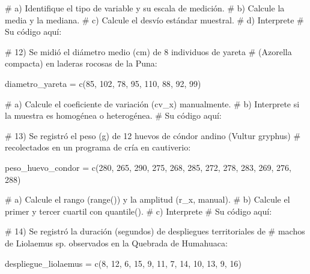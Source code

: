 \documentclass[
  spanish,
  letterpaper,
  DIV=11,
  numbers=noendperiod]{scrreprt}
\newenvironment{Shaded}{\begin{snugshade}}{\end{snugshade}}
\newcommand{\CommentTok}[1]{\textcolor[rgb]{0.37,0.37,0.37}{#1}}
\newcommand{\DecValTok}[1]{\textcolor[rgb]{0.68,0.00,0.00}{#1}}
\newcommand{\FunctionTok}[1]{\textcolor[rgb]{0.28,0.35,0.67}{#1}}
\newcommand{\NormalTok}[1]{\textcolor[rgb]{0.00,0.23,0.31}{#1}}
\newcommand{\OtherTok}[1]{\textcolor[rgb]{0.00,0.23,0.31}{#1}}
\begin{document}
\begin{Shaded}
\begin{Highlighting}[]
\CommentTok{\#     a) Identifique el tipo de variable y su escala de medición.}
\CommentTok{\#     b) Calcule la media y la mediana.}
\CommentTok{\#     c) Calcule el desvío estándar muestral.}
\CommentTok{\#     d) Interprete}
\CommentTok{\# Su código aquí:}


\CommentTok{\# 12) Se midió el diámetro medio (cm) de 8 individuos de yareta}
\CommentTok{\#     (Azorella compacta) en laderas rocosas de la Puna:}

\NormalTok{diametro\_yareta }\OtherTok{=} \FunctionTok{c}\NormalTok{(}\DecValTok{85}\NormalTok{, }\DecValTok{102}\NormalTok{, }\DecValTok{78}\NormalTok{, }\DecValTok{95}\NormalTok{, }\DecValTok{110}\NormalTok{, }\DecValTok{88}\NormalTok{, }\DecValTok{92}\NormalTok{, }\DecValTok{99}\NormalTok{)}

\CommentTok{\#     a) Calcule el coeficiente de variación (cv\_x) manualmente.}
\CommentTok{\#     b) Interprete si la muestra es homogénea o heterogénea.}
\CommentTok{\# Su código aquí:}


\CommentTok{\# 13) Se registró el peso (g) de 12 huevos de cóndor andino (Vultur gryphus)}
\CommentTok{\#     recolectados en un programa de cría en cautiverio:}

\NormalTok{peso\_huevo\_condor }\OtherTok{=} \FunctionTok{c}\NormalTok{(}\DecValTok{280}\NormalTok{, }\DecValTok{265}\NormalTok{, }\DecValTok{290}\NormalTok{, }\DecValTok{275}\NormalTok{, }\DecValTok{268}\NormalTok{, }\DecValTok{285}\NormalTok{, }\DecValTok{272}\NormalTok{, }\DecValTok{278}\NormalTok{, }\DecValTok{283}\NormalTok{, }\DecValTok{269}\NormalTok{, }\DecValTok{276}\NormalTok{, }\DecValTok{288}\NormalTok{)}

\CommentTok{\#     a) Calcule el rango (range()) y la amplitud (r\_x, manual).}
\CommentTok{\#     b) Calcule el primer y tercer cuartil con quantile().}
\CommentTok{\#     c) Interprete}
\CommentTok{\# Su código aquí:}


\CommentTok{\# 14) Se registró la duración (segundos) de despliegues territoriales de}
\CommentTok{\#     machos de Liolaemus sp. observados en la Quebrada de Humahuaca:}

\NormalTok{despliegue\_liolaemus }\OtherTok{=} \FunctionTok{c}\NormalTok{(}\DecValTok{8}\NormalTok{, }\DecValTok{12}\NormalTok{, }\DecValTok{6}\NormalTok{, }\DecValTok{15}\NormalTok{, }\DecValTok{9}\NormalTok{, }\DecValTok{11}\NormalTok{, }\DecValTok{7}\NormalTok{, }\DecValTok{14}\NormalTok{, }\DecValTok{10}\NormalTok{, }\DecValTok{13}\NormalTok{, }\DecValTok{9}\NormalTok{, }\DecValTok{16}\NormalTok{)}


\end{Highlighting}
\end{Shaded}
\end{document}
